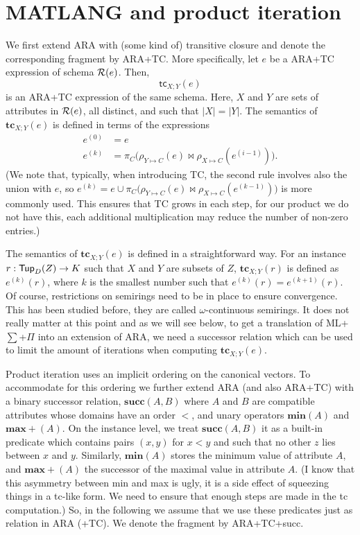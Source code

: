 
\section{MATLANG and product iteration}
We first extend ARA with (some kind of) transitive closure and denote the corresponding fragment by ARA+TC.
More specifically, let $e$ be a ARA+TC expression of schema $\mathcal{R}(e)$.
Then,
$$
\mathsf{tc}_{X;Y}(e)
$$
is an ARA+TC expression of the same schema. Here, $X$ and $Y$ are sets of attributes in $\mathcal{R}(e)$,
all distinct, and such that $|X|=|Y|$. The semantics of $\mathbf{tc}_{X;Y}(e)$ 
is defined in terms of the expressions
\begin{align*}
e^{(0)}&=e\\
e^{(k)}&=\pi_{C}\bigl(\rho_{Y\mapsto C}(e)\bowtie \rho_{X\mapsto C}(e^{(i-1)})\bigr).
\end{align*}
(We note that, typically, when introducing TC, the second rule involves also the union with $e$, so 
$e^{(k)}=e\cup \pi_{C}\bigl(\rho_{Y\mapsto C}(e)\bowtie \rho_{X\mapsto C}(e^{(k-1)})\bigr)$ is more
commonly used. This ensures that TC grows in each step, for our product we do not have this, each
additional multiplication may reduce the number of non-zero entries.)

The semantics of $\mathbf{tc}_{X;Y}(e)$ is defined in a straightforward way.
For an instance $r:\mathsf{Tup}_D(Z)\to K$ such that $X$ and $Y$ are subsets of $Z$, $\mathbf{tc}_{X;Y}(r)$ is defined as 
$e^{(k)}(r)$, where $k$ is the smallest number such that $e^{(k)}(r)=e^{(k+1)}(r)$. Of course, restrictions on semirings need to be in place to 
ensure convergence. This has been studied before, they are called $\omega$-continuous semirings. It does not really matter at this point
and as we will see below, to get a translation of ML+$\sum$+$\Pi$ into an extension of ARA, we need a successor relation which can be used to limit the amount of iterations when computing $\mathbf{tc}_{X;Y}(e)$.

Product iteration uses an implicit ordering on the canonical vectors. To accommodate for this ordering we further extend ARA (and also ARA+TC) with a binary successor relation, $\mathbf{succ}(A,B)$ where $A$ and $B$
are compatible attributes whose domains have an order $<$, and unary operators $\mathbf{min}(A)$ and $\mathbf{max+}(A)$.
 On the instance level, we treat $\mathbf{succ}(A,B)$ it as a built-in predicate
which contains pairs $(x,y)$ for $x<y$ and such that no other $z$ lies between $x$ and $y$. Similarly, $\mathbf{min}(A)$ stores the minimum value of attribute $A$, and $\mathbf{max+}(A)$ the successor of the maximal value in attribute $A$. (I know that this asymmetry between min and max is ugly, it is a side effect of squeezing things in a tc-like form. We need to ensure that enough steps are made in the tc computation.)
So, in the following we assume that we use these predicates just as relation in ARA (+TC). We denote the fragment by ARA+TC+succ.


